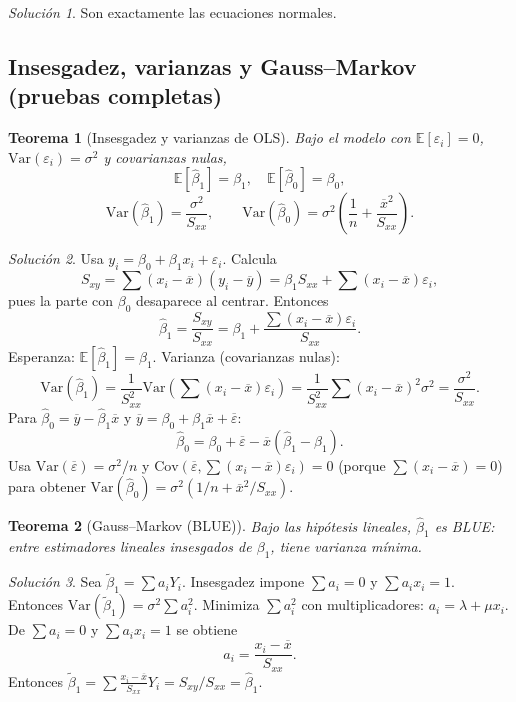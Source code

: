 \documentclass[11pt]{article}
\theoremstyle{plain}
\newtheorem{theorem}{Teorema}[section]
\theoremstyle{definition}
\theoremstyle{remark}
\theoremstyle{solstyle}
\newtheorem*{solution}{Solución}
\newcommand{\E}{\mathbb{E}}
\newcommand{\Var}{\mathrm{Var}}
\newcommand{\Cov}{\mathrm{Cov}}
\newcommand{\1}{\mathbbm{1}}
\newcommand{\xbar}{\overline{x}}
\newcommand{\ybar}{\overline{y}}
\begin{document}
\begin{solution}
Son exactamente las ecuaciones normales.
\end{solution}

\subsection{Insesgadez, varianzas y Gauss--Markov (pruebas completas)}

\begin{theorem}[Insesgadez y varianzas de OLS]\label{thm:OLSbiasvar}
Bajo el modelo con $\E[\varepsilon_i]=0$, $\Var(\varepsilon_i)=\sigma^2$ y covarianzas nulas,
\[
\E[\widehat\beta_1]=\beta_1,\quad \E[\widehat\beta_0]=\beta_0,
\]
\[
\Var(\widehat\beta_1)=\frac{\sigma^2}{S_{xx}},\qquad
\Var(\widehat\beta_0)=\sigma^2\left(\frac1n+\frac{\xbar^2}{S_{xx}}\right).
\]
\end{theorem}

\begin{solution}
Usa $y_i=\beta_0+\beta_1 x_i+\varepsilon_i$.
Calcula
\[
S_{xy}=\sum (x_i-\xbar)(y_i-\ybar)=\beta_1 S_{xx}+\sum (x_i-\xbar)\varepsilon_i,
\]
pues la parte con $\beta_0$ desaparece al centrar.
Entonces
\[
\widehat\beta_1=\frac{S_{xy}}{S_{xx}}=\beta_1+\frac{\sum (x_i-\xbar)\varepsilon_i}{S_{xx}}.
\]
Esperanza: $\E[\widehat\beta_1]=\beta_1$.
Varianza (covarianzas nulas):
\[
\Var(\widehat\beta_1)=\frac{1}{S_{xx}^2}\Var\!\left(\sum (x_i-\xbar)\varepsilon_i\right)
=\frac{1}{S_{xx}^2}\sum (x_i-\xbar)^2\sigma^2=\frac{\sigma^2}{S_{xx}}.
\]
Para $\widehat\beta_0=\ybar-\widehat\beta_1\xbar$ y $\ybar=\beta_0+\beta_1\xbar+\overline\varepsilon$:
\[
\widehat\beta_0=\beta_0+\overline\varepsilon-\xbar(\widehat\beta_1-\beta_1).
\]
Usa $\Var(\overline\varepsilon)=\sigma^2/n$ y $\Cov(\overline\varepsilon,\sum (x_i-\xbar)\varepsilon_i)=0$
(porque $\sum(x_i-\xbar)=0$) para obtener
$\Var(\widehat\beta_0)=\sigma^2(1/n+\xbar^2/S_{xx})$.
\end{solution}

\begin{theorem}[Gauss--Markov (BLUE)]\label{thm:GM}
Bajo las hipótesis lineales, $\widehat\beta_1$ es BLUE: entre estimadores lineales insesgados de $\beta_1$,
tiene varianza mínima.
\end{theorem}

\begin{solution}
Sea $\widetilde\beta_1=\sum a_i Y_i$.
Insesgadez impone $\sum a_i=0$ y $\sum a_i x_i=1$.
Entonces $\Var(\widetilde\beta_1)=\sigma^2\sum a_i^2$.
Minimiza $\sum a_i^2$ con multiplicadores:
$a_i=\lambda+\mu x_i$.
De $\sum a_i=0$ y $\sum a_i x_i=1$ se obtiene
\[
a_i=\frac{x_i-\xbar}{S_{xx}}.
\]
Entonces $\widetilde\beta_1=\sum \frac{x_i-\xbar}{S_{xx}}Y_i=S_{xy}/S_{xx}=\widehat\beta_1$.
\end{solution}
\end{document}
